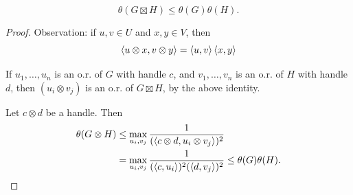 \begin{lemma}\label{lem:shannon_cap_theta_submult}
\[
\theta(G\boxtimes H)\leq \theta(G)\theta(H).
\]
\end{lemma}
\begin{proof}	
Observation: if $u,v\in U$ and $x,y \in V$, then 
\[
\braket{u\otimes x, v \otimes y} = \braket{u,v}\braket{x,y}
\]

If $u_1,\dotsc,u_n$ is an o.r. of $G$ with handle $c$, and $v_1,\dotsc,v_n$ is an o.r. of $H$ with handle $d$, then $(u_i\otimes v_j)$ is an o.r. of $G\boxtimes H$, by the above identity.

Let $c\otimes d$ be a handle. Then
\begin{align*}
\theta(G\otimes H) &\leq \max_{u_i,v_j}\frac{1}{ (\braket{c\otimes d, u_i\otimes v_j})^2}\\ &=\max_{u_i,v_j} \frac{1}{(\braket{c,u_i})^2 (\braket{d,v_j})^2}\leq \theta(G)\theta(H).
\end{align*}
\end{proof}

